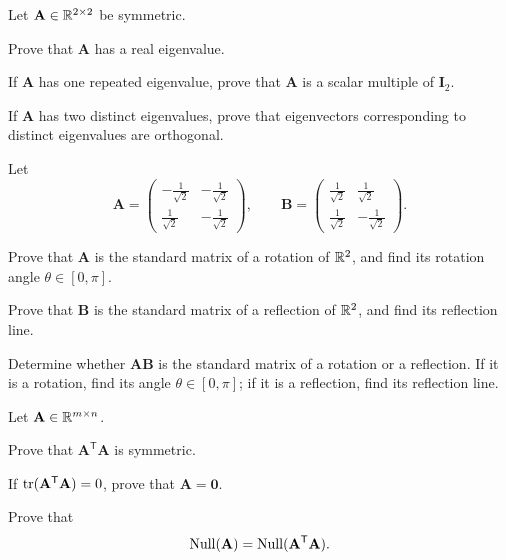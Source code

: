 \begin{problem}
Let $\mathbf A\in\mathbb{R}^{2\times2}$ be symmetric.
\begin{problemsubparts}
\item Prove that $\mathbf A$ has a real eigenvalue.
\item If $\mathbf A$ has one repeated eigenvalue, prove that $\mathbf A$ is a scalar multiple of $\mathbf I_2$.
\item If $\mathbf A$ has two distinct eigenvalues, prove that eigenvectors corresponding to distinct eigenvalues are orthogonal.
\end{problemsubparts}
\end{problem}

\begin{problem}
Let
\[
\mathbf A=
\begin{pmatrix}
-\frac1{\sqrt2}&-\frac1{\sqrt2}\\
\frac1{\sqrt2}&-\frac1{\sqrt2}
\end{pmatrix},
\qquad
\mathbf B=
\begin{pmatrix}
\frac1{\sqrt2}&\frac1{\sqrt2}\\
\frac1{\sqrt2}&-\frac1{\sqrt2}
\end{pmatrix}.
\]
\begin{problemsubparts}
\item Prove that $\mathbf A$ is the standard matrix of a rotation of $\mathbb{R}^2$, and find its rotation angle $\theta\in[0,\pi]$.
\item Prove that $\mathbf B$ is the standard matrix of a reflection of $\mathbb{R}^2$, and find its reflection line.
\item Determine whether $\mathbf A\mathbf B$ is the standard matrix of a rotation or a reflection. If it is a rotation, find its angle $\theta\in[0,\pi]$; if it is a reflection, find its reflection line.
\end{problemsubparts}
\end{problem}

\begin{problem}
Let $\mathbf A\in\mathbb{R}^{m\times n}$.
\begin{problemsubparts}
\item Prove that $\mathbf A^{\mathsf T}\mathbf A$ is symmetric.
\item If $\operatorname{tr}(\mathbf A^{\mathsf T}\mathbf A)=0$, prove that $\mathbf A=\mathbf0$.
\item Prove that
\[
\operatorname{Null}(\mathbf A)=\operatorname{Null}(\mathbf A^{\mathsf T}\mathbf A).
\]
\end{problemsubparts}
\end{problem}

